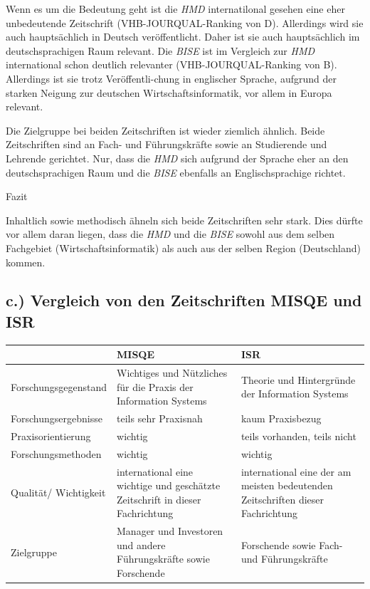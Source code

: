 \documentclass[12pt,utf8]{scrartcl}
\begin{document}
Wenn es um die Bedeutung geht ist die \emph{HMD} internatilonal gesehen eine eher unbedeutende Zeitschrift (VHB-JOURQUAL-Ranking von D)\cite{VHBJ}. Allerdings wird sie auch hauptsächlich in Deutsch veröffentlicht. Daher ist sie auch hauptsächlich im deutschsprachigen Raum relevant. 
Die \emph{BISE} ist im Vergleich zur \emph{HMD} international schon deutlich relevanter (VHB-JOURQUAL-Ranking von B)\cite{VHBJ}. Allerdings ist sie trotz Veröffentli-chung in englischer Sprache, aufgrund der starken Neigung zur deutschen Wirtschaftsinformatik, vor allem in Europa relevant. 

Die Zielgruppe bei beiden Zeitschriften ist wieder ziemlich ähnlich. Beide Zeitschriften sind an Fach- und Führungskräfte sowie an Studierende und Lehrende gerichtet. Nur, dass die \emph{HMD} sich aufgrund der Sprache eher an den deutschsprachigen Raum und die \emph{BISE} ebenfalls an Englischsprachige richtet.
\newline
\newline

{\Large Fazit}

Inhaltlich sowie methodisch ähneln sich beide Zeitschriften sehr stark. Dies dürfte vor allem daran liegen, dass die \emph{HMD} und die \emph{BISE} sowohl aus dem selben Fachgebiet (Wirtschaftsinformatik) als auch aus der selben Region (Deutschland) kommen.
\subsection{\label{sub3:einfuehrung}c.) Vergleich von den Zeitschriften MISQE und ISR}

\begin{tabular}{|p{4cm}|p{5.5cm}|p{5.5cm}|}
\hline
& MISQE & ISR \\
\hline
Forschungsgegenstand & Wichtiges und Nützliches für die Praxis der Information Systems & Theorie und Hintergründe der Information Systems \\
\hline
Forschungsergebnisse & teils sehr Praxisnah & kaum Praxisbezug \\
\hline
Praxisorientierung & wichtig & teils vorhanden, teils nicht \\
\hline
Forschungsmethoden & wichtig & wichtig \\
\hline
Qualität/ Wichtigkeit & international eine wichtige und geschätzte Zeitschrift in dieser Fachrichtung & international eine der am meisten bedeutenden Zeitschriften dieser Fachrichtung \\
\hline
Zielgruppe & Manager und Investoren und andere Führungskräfte sowie Forschende & Forschende sowie Fach- und Führungskräfte \\
\hline
\end{tabular}
\newline
\newline
\newline
\end{document}
